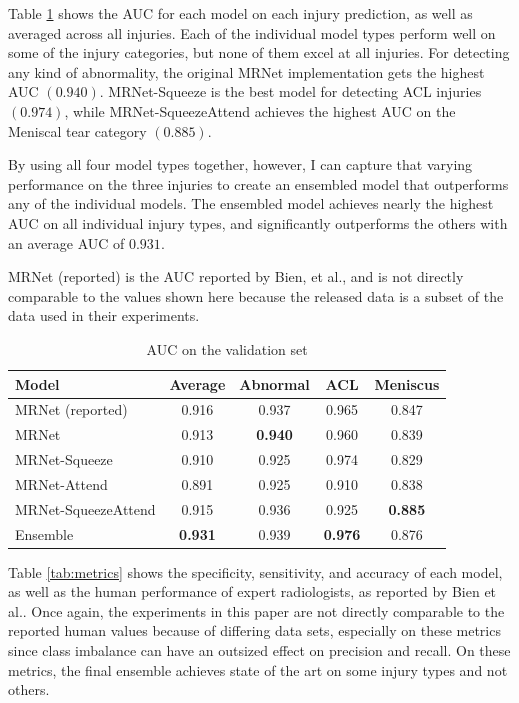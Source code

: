 \documentclass[10pt,twocolumn,letterpaper]{article}
\begin{document}
Table \ref{tab:results} shows the AUC for each model on each injury prediction, as well as averaged across all injuries. Each of the individual model types perform well on some of the injury categories, but none of them excel at all injuries. For detecting any kind of abnormality, the original MRNet implementation gets the highest AUC $(0.940)$. MRNet-Squeeze is the best model for detecting ACL injuries $(0.974)$, while MRNet-SqueezeAttend achieves the highest AUC on the Meniscal tear category $(0.885)$.

By using all four model types together, however, I can capture that varying performance on the three injuries to create an ensembled model that outperforms any of the individual models. The ensembled model achieves nearly the highest AUC on all individual injury types, and significantly outperforms the others with an average AUC of $0.931$.

MRNet (reported) is the AUC reported by Bien, et al.\cite{bien2018deep}, and is not directly comparable to the values shown here because the released data is a subset of the data used in their experiments.

\begin{table}[h!]
\begin{center}
\begin{tabular}{|l|c|c|c|c|}
\hline
Model & Average & Abnormal & ACL & Meniscus \\
\hline
MRNet (reported) & 0.916 & 0.937 & 0.965 & 0.847 \\
\hline
MRNet & 0.913 & \textbf{0.940} & 0.960 & 0.839 \\
MRNet-Squeeze & 0.910 & 0.925 & 0.974 & 0.829 \\
MRNet-Attend & 0.891 & 0.925 & 0.910 & 0.838 \\
MRNet-SqueezeAttend & 0.915 & 0.936 & 0.925 & \textbf{0.885}\\
\hline
Ensemble & \textbf{0.931} & 0.939 & \textbf{0.976} & 0.876 \\
\hline
\end{tabular}
\end{center}
\caption{AUC on the validation set}
\label{tab:results}
\end{table}

Table \ref{tab:metrics} shows the specificity, sensitivity, and accuracy of each model, as well as the human performance of expert radiologists, as reported by Bien et al.\cite{bien2018deep}. Once again, the experiments in this paper are not directly comparable to the reported human values because of differing data sets, especially on these metrics since class imbalance can have an outsized effect on precision and recall. On these metrics, the final ensemble achieves state of the art on some injury types and not others.
\end{document}
